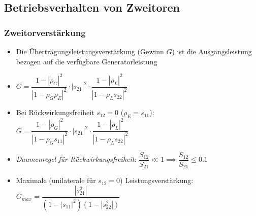 \subsection{Betriebsverhalten von Zweitoren}
\subsubsection{Zweitorverstärkung}
\begin{itemize}
    \itemsep3pt
    \item Die Übertragungsleistungsverstärkung (Gewinn $G$) ist die Ausgangsleistung bezogen auf die verfügbare Generatorleistung
    \item \(G = \dfrac{1 - |\rho_G|^2}{|1 - \rho_G \rho_E|^2} \cdot |s_{21}|^2 \cdot \dfrac{1 - |\rho_L|^2}{|1 - \rho_{L}s_{22}|^2}\)
    \item Bei Rückwirkungsfreiheit $s_{12} = 0$ ($\rho_E = s_{11}$):\\
        \(G = \dfrac{1 - |\rho_G|^2}{|1 - \rho_G s_{11}|^2} \cdot |s_{21}|^2 \cdot \dfrac{1 - |\rho_L|^2}{|1 - \rho_{L}s_{22}|^2}\)
    \item \textit{Daumenregel für Rückwirkungsfreiheit}: \(\dfrac{S_{12}}{S_{21}} \ll 1 \implies \dfrac{S_{12}}{S_{21}} \leq 0.1\)
    \item Maximale (unilaterale für $s_{12} = 0$) Leistungsverstärkung:\\
        \(G_{max} = \dfrac{|s_{21}^2|}{(1 - |s_{11}|^2) (1 - |s_{22}^2|)}\)
\end{itemize}
